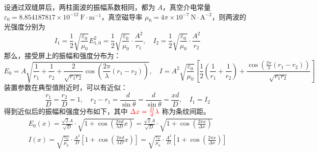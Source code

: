 \documentclass[UTF8]{report}
\theoremstyle{MyLineTheoremStyle} %
\theoremstyle{MyBlockTheoremStyle} %
\theoremstyle{MySubsubsectionStyle} %
\begin{document}
设通过双缝屏后，两柱面波的振幅系数相同，都为 $A$，真空介电常量 $\varepsilon_0 = 8.854187817 \times 10^{-12}\ \mathrm{F\cdot m^{-1}}$，真空磁导率 $\mu_0 = 4\pi \times 10^{-7}\ \mathrm{N\cdot A^{-2}}$，则两波的光强度分别为
\begin{equation}
    I_1 = \frac{1}{2}\sqrt{\frac{\varepsilon_0}{\mu_0}}E_{1,0}^2 = \frac{1}{2}\sqrt{\frac{\varepsilon_0}{\mu_0}} \cdot \frac{A^2}{r_1},\quad
    I_2 = \frac{1}{2}\sqrt{\frac{\varepsilon_0}{\mu_0}} \cdot \frac{A^2}{r_2}
\end{equation}
那么，接受屏上的振幅和强度分布为：
\begin{equation}
    E_0 = A \sqrt{ \frac{1}{r_1} + \frac{1}{r_2} + \frac{2}{\sqrt{r_1r_2}} \cos \left( \frac{2 \pi}{\lambda}(r_1 - r_2) \right)  }  ,\quad 
    I = A^2\sqrt{\frac{\varepsilon_0}{\mu_0}}\left[ \frac{1}{2}\left( \frac{1}{r_1} + \frac{1}{r_2} \right) + \frac{\cos \left( \frac{2 \pi}{\lambda}(r_1 - r_2) \right)}{\sqrt{r_1r_2} } \right]
\end{equation}
装置参数在典型值附近时，可以有近似：
\begin{equation}\label{杨氏双缝干涉近似}
\frac{r_1}{D} = \frac{r_2}{D} = 1,\quad r_2 - r_1 = \frac{d}{\sin \theta} = \frac{d}{\sin \theta} = \frac{x d}{ D },\quad I_1 = I_2
\end{equation}
得到近似后的振幅和强度分布如下，其中 ${\color{red} \Delta x= \frac{D}{d}\lambda }$ 称为条纹间距。
\begin{gather}\label{杨氏双缝干涉近似结果}
    E_0(x) = \frac{\sqrt{2}A}{\sqrt{D}} \cdot \sqrt{1 + \cos \left( \frac{2 \pi d}{\lambda D}x \right)} = \frac{\sqrt{2}A}{\sqrt{D}} \cdot \sqrt{1 + \cos \left( \frac{2 \pi x}{\Delta x} \right)} \\ 
    I(x) = \sqrt{\frac{\varepsilon_0}{\mu_0}} \cdot \frac{A^2}{D} \left[ 1 + \cos \left( \frac{2 \pi  d}{\lambda D }x \right) \right] = \sqrt{\frac{\varepsilon_0}{\mu_0}} \cdot \frac{A^2}{D} \left[ 1 + \cos \left( \frac{2 \pi x}{\Delta x} \right) \right]
\end{gather}
\end{document}
